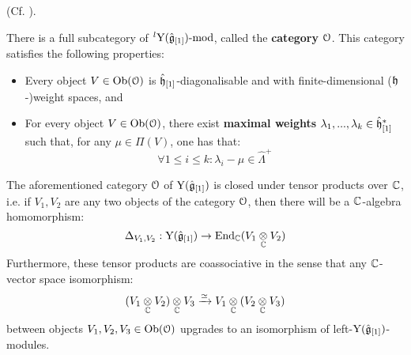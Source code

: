         \begin{lemma} \label{lemma: category_O_affine_yangian}
            (Cf. \cite[Theorem 4.9]{guay_nakajima_wendlandt_affine_yangian_coproduct}).
        
            There is a full subcategory of ${}^l\mathrm{Y}(\hat{\mathfrak{g}}_{[1]})\text{-}\mathrm{mod}$, called the \textbf{category $\mathcal{O}$}. This category satisfies the following properties:
            \begin{itemize}
                \item Every object $V \in \mathrm{Ob}(\mathcal{O})$ is $\hat{\mathfrak{h}}_{[1]}$-diagonalisable and with finite-dimensional ($\mathfrak{h}$-)weight spaces, and
                \item For every object $V \in \mathrm{Ob}(\mathcal{O})$, there exist \textbf{maximal weights} $\lambda_1, ..., \lambda_k \in \hat{\mathfrak{h}}_{[1]}^*$ such that, for any $\mu \in \Pi(V)$, one has that:
                    $$\forall 1 \leq i \leq k: \lambda_i - \mu \in \hat{\Lambda}^+$$
            \end{itemize}

            The aforementioned category $\mathcal{O}$ of $\mathrm{Y}(\hat{\mathfrak{g}}_{[1]})$ is closed under tensor products over $\mathbb{C}$, i.e. if $V_1, V_2$ are any two objects of the category $\mathcal{O}$, then there will be a $\mathbb{C}$-algebra homomorphism:
                $$\Delta_{V_1, V_2}: \rmY(\hat{\g}_{[1]}) \to \End_{\bbC}(V_1 \tensor_{\bbC} V_2)$$
            Furthermore, these tensor products are coassociative in the sense that any $\mathbb{C}$-vector space isomorphism:
                $$(V_1 \tensor_{\bbC} V_2) \tensor_{\bbC} V_3 \xrightarrow[]{\cong} V_1 \tensor_{\bbC} (V_2 \tensor_{\bbC} V_3)$$
            between objects $V_1, V_2, V_3 \in \mathrm{Ob}(\mathcal{O})$ upgrades to an isomorphism of left-$\mathrm{Y}(\hat{\mathfrak{g}}_{[1]})$-modules.


\end{lemma}
